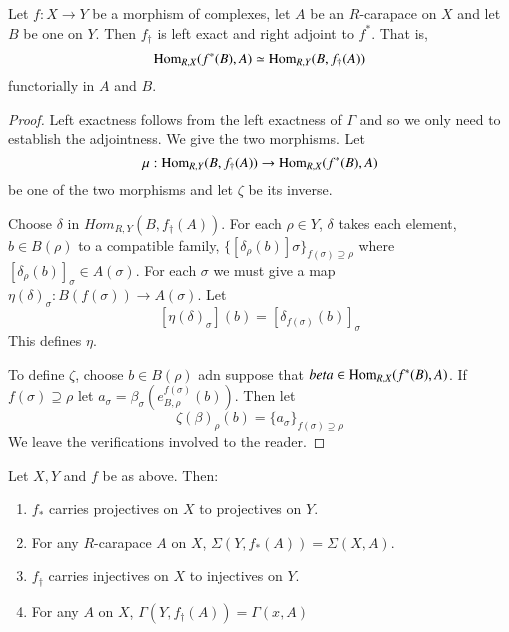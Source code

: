 \begin{prop}\label{art6-prop-5.4}
Let $f: X\rightarrow Y$ be a morphism of complexes, let $A$ be an $R$-carapace on $X$ and let $B$ be one on $Y$. Then $f_{\dagger}$ is left exact and right adjoint to $f^{*}$. That is,
$$
\operatorname{Hom}_{R,X}(f^{*}(B), A)\simeq \operatorname{Hom}_{R,Y}(B, f_{\dagger}(A))
$$
functorially in $A$ and $B$.
\end{prop}

\begin{proof}
Left exactness follows from the left exactness of $\Gamma$ and so we only need to establish the adjointness. We give the two morphisms. Let
$$
\mu : \operatorname{Hom}_{R, Y}(B, f_{\dagger}(A)) \rightarrow \operatorname{Hom}_{R,X}(f^{*}(B), A)
$$
be one of the two morphisms and let $\zeta$ be its inverse.

Choose $\delta$ in $Hom_{R,Y}(B, f_{\dagger}(A))$. For each $\rho \in Y$, $\delta$ takes each element, $b \in B(\rho)$ to a compatible family, $\{[\delta_{\rho}(b)]\sigma\}_{f(\sigma)\supseteq \rho}$ where $[\delta_{\rho}(b)]_{\sigma} \in A(\sigma)$. For each $\sigma$ we must give a map $\eta (\delta)_{\sigma}: B(f(\sigma)) \rightarrow A(\sigma)$. Let
$$
\left[\eta (\delta)_{\sigma}\right](b) = \left[\delta_{f(\sigma)}(b)\right]_{\sigma}
$$
This defines $\eta$.

To define $\zeta$, choose $b \in B(\rho)$ adn suppose that $beta \in \operatorname{Hom}_{R,X}(f^{*}(B), A)$. If $f(\sigma)\supseteq \rho$ let $a_{\sigma} = \beta_{\sigma}(e_{B, \rho}^{f(\sigma)}(b))$. Then let
$$
\zeta(\beta)_{\rho}(b) = \{a_{\sigma}\}_{f(\sigma)\supseteq \rho}
$$
We leave the verifications involved to the reader.
\end{proof}

\begin{coro}\label{art6-corollary-5.5}
Let $X, Y$ and $f$ be as above. Then:
    \begin{enumerate}[(1)]
    \item $f_{*}$ carries projectives on $X$ to projectives on $Y$.\label{art6-corollary5.5-enum-1}
    \item For any $R$-carapace $A$ on $X$, $\Sigma(Y, f_{*}(A)) = \Sigma(X, A)$.\label{art6-corollary5.5-enum-2}
    \item $f_{\dagger}$ carries injectives on $X$ to injectives on $Y$.\label{art6-corollary5.5-enum-3}
    \item For any $A$ on $X$, $\Gamma(Y, f_{\dagger}(A))= \Gamma(x, A)$\label{art6-corollary5.5-enum-4}
    \end{enumerate}
\end{coro}

